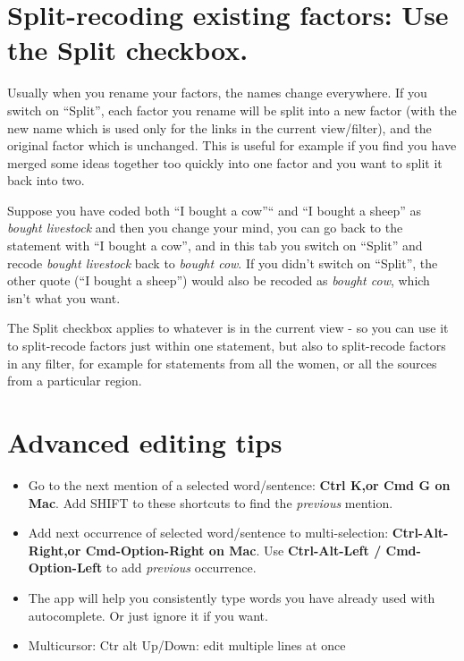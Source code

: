 \documentclass[
]{book}
\providecommand{\tightlist}{%
  \setlength{\itemsep}{0pt}\setlength{\parskip}{0pt}}
\begin{document}
\hypertarget{split-recoding}{%
\section{\texorpdfstring{Split-recoding existing factors: Use the \textbf{Split} checkbox.}{Split-recoding existing factors: Use the Split checkbox.}}\label{split-recoding}}

Usually when you rename your factors, the names change everywhere. If you switch on ``Split'', each factor you rename will be split into a new factor (with the new name which is used only for the links in the current view/filter), and the original factor which is unchanged. This is useful for example if you find you have merged some ideas together too quickly into one factor and you want to split it back into two.

Suppose you have coded both ``I bought a cow''`` and ``I bought a sheep'' as \emph{bought livestock} and then you change your mind, you can go back to the statement with ``I bought a cow'', and in this tab you switch on ``Split'' and recode \emph{bought livestock} back to \emph{bought cow}. If you didn't switch on ``Split'', the other quote (``I bought a sheep'') would also be recoded as \emph{bought cow}, which isn't what you want.

The Split checkbox applies to whatever is in the current view - so you can use it to split-recode factors just within one statement, but also to split-recode factors in any filter, for example for statements from all the women, or all the sources from a particular region.

\hypertarget{advanced-editing-tips}{%
\section{Advanced editing tips}\label{advanced-editing-tips}}

\begin{itemize}
\tightlist
\item
  Go to the next mention of a selected word/sentence: \textbf{Ctrl K,or Cmd G on Mac}. Add SHIFT to these shortcuts to find the \emph{previous} mention.
\item
  Add next occurrence of selected word/sentence to multi-selection: \textbf{Ctrl-Alt-Right,or Cmd-Option-Right on Mac}. Use \textbf{Ctrl-Alt-Left / Cmd-Option-Left} to add \emph{previous} occurrence.
\item
  The app will help you consistently type words you have already used with autocomplete. Or just ignore it if you want.
\item
  Multicursor: Ctr alt Up/Down: edit multiple lines at once
\end{itemize}
\end{document}
